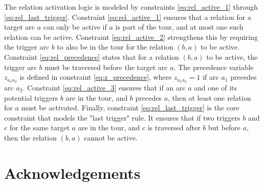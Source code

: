 \documentclass[twocolumn, switch]{article} %
\begin{document}
The relation activation logic is modeled by constraints \eqref{eq:rel_active_1} through \eqref{eq:rel_last_trigger}.
Constraint \eqref{eq:rel_active_1} ensures that a relation for a target arc $a$ can only be active if $a$ is part of the tour, and at most one such relation can be active.
Constraint \eqref{eq:rel_active_2} strengthens this by requiring the trigger arc $b$ to also be in the tour for the relation $(b,a)$ to be active.
Constraint \eqref{eq:rel_precedence} states that for a relation $(b,a)$ to be active, the trigger arc $b$ must be traversed before the target arc $a$.
The precedence variable $z_{a_1a_2}$ is defined in constraint \eqref{eq:z_precedence}, where $z_{a_1a_2}=1$ if arc $a_1$ precedes arc $a_2$.
Constraint \eqref{eq:rel_active_3} ensures that if an arc $a$ and one of its potential triggers $b$ are in the tour, and $b$ precedes $a$, then at least one relation for $a$ must be activated.
Finally, constraint \eqref{eq:rel_last_trigger} is the core constraint that models the "last trigger" rule. It ensures that if two triggers $b$ and $c$ for the same target $a$ are in the tour, and $c$ is traversed after $b$ but before $a$, then the relation $(b,a)$ cannot be active.


\footnotesize
\section*{Acknowledgements}

\normalsize



\end{document}
